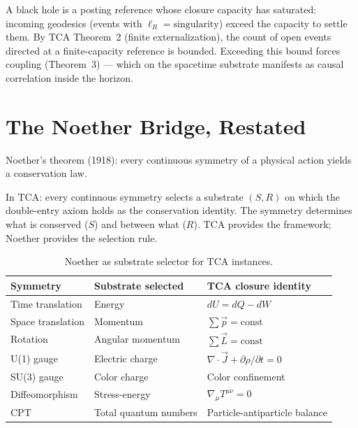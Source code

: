 \documentclass[11pt]{article}
\begin{document}
\begin{corollary}
A black hole is a posting reference whose closure capacity has
saturated: incoming geodesics (events with $\ell_R = \text{singularity}$)
exceed the capacity to settle them. By TCA Theorem~2 (finite
externalization), the count of open events directed at a
finite-capacity reference is bounded. Exceeding this bound forces
coupling (Theorem~3) --- which on the spacetime substrate manifests as
causal correlation inside the horizon.
\end{corollary}

\section{The Noether Bridge, Restated}

Noether's theorem (1918): every continuous symmetry of a physical
action yields a conservation law.

In TCA: every continuous symmetry selects a substrate $(S, R)$ on
which the double-entry axiom holds as the conservation identity.
The symmetry determines what is conserved ($S$) and between what
($R$). TCA provides the framework; Noether provides the selection
rule.

\begin{table}[h]
\centering
\begin{tabular}{@{}lll@{}}
\toprule
\textbf{Symmetry} & \textbf{Substrate selected} & \textbf{TCA closure identity} \\
\midrule
Time translation & Energy & $dU = dQ - dW$ \\
Space translation & Momentum & $\sum \vec{p} = \text{const}$ \\
Rotation & Angular momentum & $\sum \vec{L} = \text{const}$ \\
U(1) gauge & Electric charge & $\nabla \cdot \vec{J} + \partial\rho/\partial t = 0$ \\
SU(3) gauge & Color charge & Color confinement \\
Diffeomorphism & Stress-energy & $\nabla_\mu T^{\mu\nu} = 0$ \\
CPT & Total quantum numbers & Particle-antiparticle balance \\
\bottomrule
\end{tabular}
\caption{Noether as substrate selector for TCA instances.}
\end{table}

\end{document}
